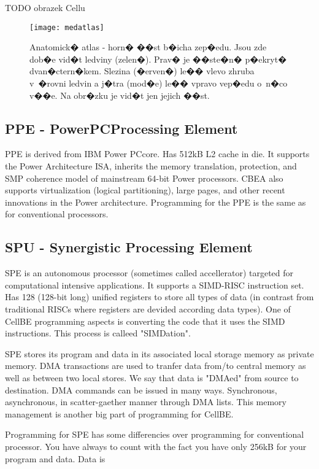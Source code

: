 TODO obrazek Cellu
\begin{figure}
    \centering
    \texttt{[image: medatlas]}
    \caption[CellBE processor layout]{Anatomick� atlas - horn� ��st b�icha zep�edu.
      Jsou zde dob�e vid�t ledviny (zelen�).
      Prav� je ��ste�n� p�ekryt� dvan�ctern�kem.
      Slezina (�erven�) le�� vlevo zhruba v~�rovni ledvin a j�tra (mod�e) le�� vpravo vep�edu o~n�co v��e.
      Na obr�zku je vid�t jen jejich ��st.}
    \label{fg:processorLayout}
\end{figure}

\subsection{PPE - PowerPC\textregistered Processing Element}
PPE is derived from IBM Power PC\textregistered core. Has 512kB L2 cache in die. It supports the Power Architecture ISA, inherits the memory translation, protection, and SMP coherence model of mainstream 64-bit Power processors. CBEA also supports virtualization (logical partitioning), large pages, and other recent innovations in the Power architecture. Programming for the PPE is the same as for conventional processors.

\subsection{SPU - Synergistic Processing Element}
SPE is an autonomous processor (sometimes called accellerator) targeted for computational intensive applications. It supports a SIMD-RISC instruction set. Has 128 (128-bit long) unified registers to store all types of data (in contrast from traditional RISCs where registers are devided according data types). One of CellBE programming aspects is converting the code that it uses the SIMD instructions. This process is calleed "SIMDation".

SPE stores its program and data in its associated local storage memory as private memory. DMA transactions are used to tranfer data from/to central memory as well as between two local stores. We say that data is "DMAed" from source to destination. DMA commands can be issued in many ways. Synchronous, asynchronous, in scatter-gaether manner through DMA lists. This memory management is another big part of programming for CellBE.

Programming for SPE has some differencies over programming for conventional processor. You have always to count with the fact you have only 256kB for your program and data. Data is 

